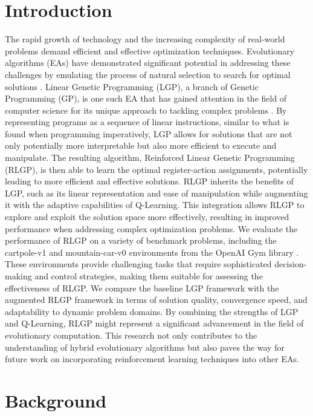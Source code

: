 \documentclass[12pt, final]{dalcsthesis}
\begin{document}
\mainmatter

\chapter{Introduction}
The rapid growth of technology and the increasing complexity of real-world problems demand efficient and effective optimization techniques. Evolutionary algorithms (EAs) have demonstrated significant potential in addressing these challenges by emulating the process of natural selection to search for optimal solutions \cite{poli08}. Linear Genetic Programming (LGP), a branch of Genetic Programming (GP), is one such EA that has gained attention in the field of computer science for its unique approach to tackling complex problems \cite{song03}. By representing programs as a sequence of linear instructions, similar to what is found when programming imperatively, LGP allows for solutions that are not only potentially more interpretable but also more efficient to execute and manipulate.
The resulting algorithm, Reinforced Linear Genetic Programming (RLGP), is then able to learn the optimal register-action assignments, potentially leading to more efficient and effective solutions. RLGP inherits the benefits of LGP, such as its linear representation and ease of manipulation while augmenting it with the adaptive capabilities of Q-Learning. This integration allows RLGP to explore and exploit the solution space more effectively, resulting in improved performance when addressing complex optimization problems.
We evaluate the performance of RLGP on a variety of benchmark problems, including the cartpole-v1 and mountain-car-v0 environments from the OpenAI Gym library \cite{1606.01540}. These environments provide challenging tasks that require sophisticated decision-making and control strategies, making them suitable for assessing the effectiveness of RLGP. We compare the baseline LGP framework with the augmented RLGP framework in terms of solution quality, convergence speed, and adaptability to dynamic problem domains.
By combining the strengths of LGP and Q-Learning, RLGP might represent a significant advancement in the field of evolutionary computation. This research not only contributes to the understanding of hybrid evolutionary algorithms but also paves the way for future work on incorporating reinforcement learning techniques into other EAs.

\chapter{Background}
\end{document}
